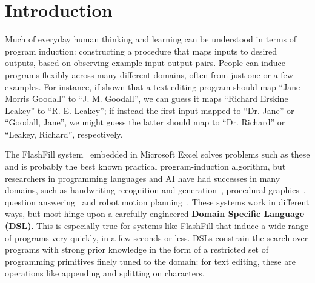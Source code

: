 \documentclass{article}
\newcommand{\system}{\textsc{DreamCoder}~}
\begin{document}

\section{Introduction}


Much of everyday human thinking and learning can be understood in
terms of program induction: constructing a procedure that maps inputs
to desired outputs, based on observing example input-output pairs.
People can induce programs flexibly across many different domains, often from just one or a few examples.  For instance, if
shown that a text-editing program should map ``Jane Morris Goodall''
to ``J. M. Goodall'', we can guess it maps ``Richard Erskine Leakey''
to ``R. E. Leakey''; if instead the first input mapped to
``Dr. Jane'' or ``Goodall, Jane'', we might guess
the latter should map to ``Dr. Richard'' or ``Leakey, Richard'',
 respectively.

The FlashFill system~\cite{gulwani2011automating} embedded in
Microsoft Excel solves problems such as these and is probably the best
known practical program-induction algorithm, but researchers in
programming languages and AI have had successes in many domains, such as handwriting recognition and
generation~\cite{lake2015human}, procedural
graphics~\cite{ellis2017learning}, question
answering~\cite{johnson2017clevr} and robot motion
planning~\cite{devlin2017neural}.  These systems
work in different ways, but most hinge upon a carefully engineered
\textbf{Domain Specific Language (DSL)}.  This is especially true for
systems like FlashFill that induce a wide range of programs
very quickly, in a few seconds or less.  DSLs constrain the search
over programs with strong prior knowledge in the form of a restricted
set of programming primitives finely tuned to the domain: for
text editing, these are operations like appending and
splitting on characters.
\end{document}
